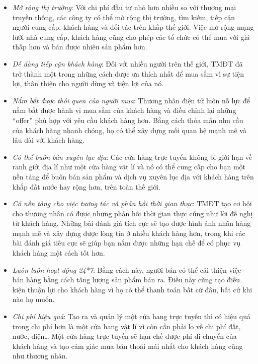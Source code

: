 \documentclass[13pt,a4paper]{article}
\begin{document}
\begin{itemize}
\item \textit{Mở rộng thị trường}: Với chi phí đầu tư nhỏ hơn nhiều so với thương mại truyền thống, các công ty có thể mở rộng thị trường, tìm kiếm, tiếp cận người cung cấp, khách hàng và đối tác trên khắp thế giới. Việc mở rộng mạng lưới nhà cung cấp, khách hàng cũng cho phép các tổ chức có thể mua với giá thấp hơn và bán được nhiêu sản phẩm hơn.\\
\item \textit{Dễ dàng tiếp cận khách hàng}: Đối với nhiều người trên thế giới, TMĐT đã trở thành một trong những cách được ưa thích nhất để mua sắm vì sự tiện lợi, thân thiện cho người dùng và tiện lợi của nó.\\
\item \textit{Nắm bắt được thói quen của người mua}: Thương nhân điện tử luôn nỗ lực để nắm bắt được hành vi mua sắm của khách hàng và điều chỉnh lại những “offer” phù hợp với yêu cầu khách hàng hơn. Bằng cách thỏa mãn nhu cầu của khách hàng nhanh chóng, họ có thể xây dựng mối quan hệ mạnh mẽ và lâu dài với khách hàng.\\
\item \textit{Có thể buôn bán xuyên lục địa}: Các cửa hàng trực tuyển không bị giới hạn về ranh giới địa lí như một cừa hàng vật lí và nó có thể cung cấp cho bạn một nền tảng để buôn bán sản phẩm và dịch vụ xuyên lục địa với khách hàng trên khắp đất nước hay rộng hơn, trên toàn thế giới.\\
\item \textit{Có nền tảng cho việc tương tác và phản hồi thời gian thực}: TMĐT tạo cơ hội cho thương nhân có được những phản hồi thời gian thực cũng như lời đề nghị từ khách hàng. Những bài đánh giá tích cực sẽ tạo được hình ảnh nhãn hàng mạnh mẽ và xây dựng được lòng tin ở nhiều khách hàng hơn, trong khi các bài đánh giá tiêu cực sẽ giúp bạn nắm được những hạn chế để có phục vụ khách hàng một cách tốt hơn.\\
\item \textit{Luôn luôn hoạt động 24*7}: Bằng cách này, người bán có thể cải thiện việc bán hàng bằng cách tăng
lượng sản phẩm bán ra. Điều này cũng tạo điều kiện thuận lợi cho khách hàng vì họ có thể thanh toán bất cứ đâu, bất cứ khi nào họ muốn.\\
\item \textit{Chi phí hiệu quả}: Tạo ra và quản lý một cửa hang trực tuyến thì có hiệu quả trong chi phí hơn là một cửa hang vật lí vì còn cần phải lo về chi phí đất, nước, điện… Một cửa hàng trực tuyến sẽ hạn chế được phí di chuyển của khách hàng và tạo cảm giác mua bán thoải mái nhất cho khách hàng cũng như thương nhân.
\end{itemize}
\end{document}
